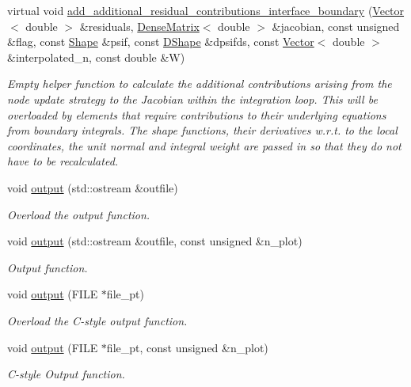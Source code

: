 \begin{DoxyCompactItemize}
virtual void \hyperlink{classoomph_1_1FluidInterfaceBoundingElement_a4510bd81b572d758694715f673080041}{add\+\_\+additional\+\_\+residual\+\_\+contributions\+\_\+interface\+\_\+boundary} (\hyperlink{classoomph_1_1Vector}{Vector}$<$ double $>$ \&residuals, \hyperlink{classoomph_1_1DenseMatrix}{Dense\+Matrix}$<$ double $>$ \&jacobian, const unsigned \&flag, const \hyperlink{classoomph_1_1Shape}{Shape} \&psif, const \hyperlink{classoomph_1_1DShape}{D\+Shape} \&dpsifds, const \hyperlink{classoomph_1_1Vector}{Vector}$<$ double $>$ \&interpolated\+\_\+n, const double \&W)
\begin{DoxyCompactList}\small\item\em Empty helper function to calculate the additional contributions arising from the node update strategy to the Jacobian within the integration loop. This will be overloaded by elements that require contributions to their underlying equations from boundary integrals. The shape functions, their derivatives w.\+r.\+t. to the local coordinates, the unit normal and integral weight are passed in so that they do not have to be recalculated. \end{DoxyCompactList}\item 
void \hyperlink{classoomph_1_1FluidInterfaceBoundingElement_a81adc5ae89ddfa120f587c61b972622f}{output} (std\+::ostream \&outfile)
\begin{DoxyCompactList}\small\item\em Overload the output function. \end{DoxyCompactList}\item 
void \hyperlink{classoomph_1_1FluidInterfaceBoundingElement_af2c821d51d506221976a0c17e1615ac3}{output} (std\+::ostream \&outfile, const unsigned \&n\+\_\+plot)
\begin{DoxyCompactList}\small\item\em Output function. \end{DoxyCompactList}\item 
void \hyperlink{classoomph_1_1FluidInterfaceBoundingElement_a85cc62405429744e3e3585894315cb9e}{output} (F\+I\+LE $\ast$file\+\_\+pt)
\begin{DoxyCompactList}\small\item\em Overload the C-\/style output function. \end{DoxyCompactList}\item 
void \hyperlink{classoomph_1_1FluidInterfaceBoundingElement_ae85ea987a06275a03ad6d0e3710871da}{output} (F\+I\+LE $\ast$file\+\_\+pt, const unsigned \&n\+\_\+plot)
\begin{DoxyCompactList}\small\item\em C-\/style Output function. \end{DoxyCompactList}\end{DoxyCompactItemize}
